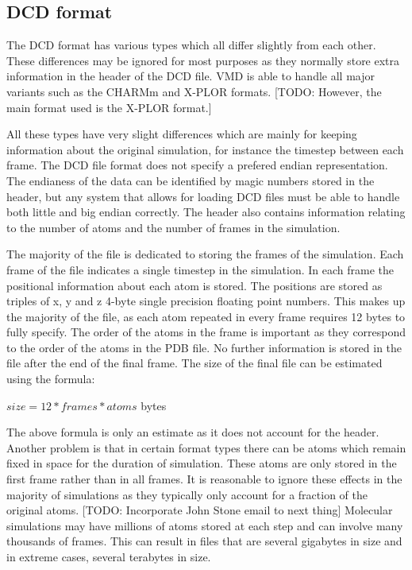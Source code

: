 \documentclass[a4paper,11pt]{report}
\begin{document}
\subsection{DCD format}
The DCD format has various types which all differ slightly from each other. These differences may be ignored for most purposes as they normally store extra information in the header of the DCD file. VMD is able to handle all major variants such as the CHARMm and X-PLOR formats. [TODO: However, the main format used is the X-PLOR format.] \cite{vmddcdformat}

All these types have very slight differences which are mainly for keeping information about the original simulation, for instance the timestep between each frame. The DCD file format does not specify a prefered endian representation. The endianess of the data can be identified by magic numbers stored in the header, but any system that allows for loading DCD files must be able to handle both little and big endian correctly. The header also contains information relating to the number of atoms and the number of frames in the simulation.

The majority of the file is dedicated to storing the frames of the simulation. Each frame of the file indicates a single timestep in the simulation. In each frame the positional information about each atom is stored. The positions are stored as triples of x, y and z 4-byte single precision floating point numbers. This makes up the majority of the file, as each atom repeated in every frame requires 12 bytes to fully specify. The order of the atoms in the frame is important as they correspond to the order of the atoms in the PDB file. No further information is stored in the file after the end of the final frame. The size of the final file can be estimated using the formula: 

\begin{center} $size = 12*frames*atoms$ bytes\end{center}

The above formula is only an estimate as it does not account for the header. Another problem is that in certain format types there can be atoms which remain fixed in space for the duration of simulation. These atoms are only stored in the first frame rather than in all frames. It is reasonable to ignore these effects in the majority of simulations as they typically only account for a fraction of the original atoms. [TODO: Incorporate John Stone email to next thing] Molecular simulations may have millions of atoms stored at each step and can involve many thousands of frames. This can result in files that are several gigabytes in size and in extreme cases, several terabytes in size.
\end{document}
